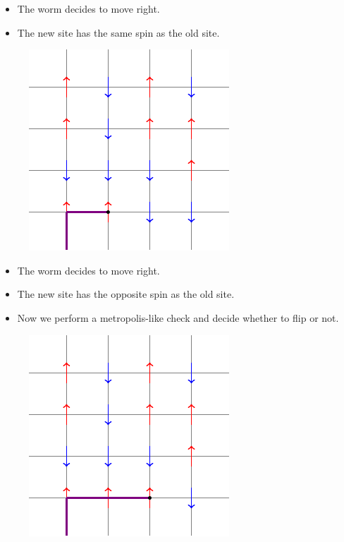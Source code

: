 \documentclass{beamer}
\begin{document}
\begin{frame}
\begin{itemize}
    \item The worm decides to move right.
    \item The new site has the same spin as the old site.
\end{itemize}
\begin{figure}
    \centering
    \includegraphics{tikz2.pdf}
\end{figure}
\end{frame}

\begin{frame}
\begin{itemize}
    \item The worm decides to move right.
    \item The new site has the opposite spin as the old site.
    \item Now we perform a metropolis-like check and decide whether to flip or not.
\end{itemize}
\begin{figure}
    \centering
    \includegraphics{tikz3.pdf}
\end{figure}
\end{frame}
\end{document}
